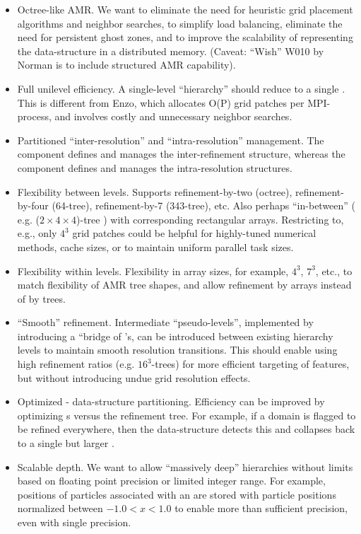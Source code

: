 \begin{itemize}
%
    \item Octree-like AMR. We want to eliminate the need for heuristic
      grid placement algorithms and neighbor searches, to simplify
      load balancing, eliminate the need for persistent ghost zones,
      and to improve the scalability of representing the
      data-structure in a distributed memory. (Caveat: ``Wish'' W010
      by Norman is to include structured AMR capability).
%
    \item Full unilevel efficiency. A single-level  ``hierarchy''
      should reduce to a single . This is different from Enzo,
      which allocates O(P) grid patches per MPI-process, and involves
      costly and unnecessary neighbor searches.
%
    \item Partitioned ``inter-resolution'' and ``intra-resolution''
      management. The  component defines and manages the
      inter-refinement structure, whereas the  component
      defines and manages the intra-resolution structures.
%
    \item Flexibility between levels. Supports refinement-by-two
      (octree), refinement-by-four (64-tree), refinement-by-7
      (343-tree), etc. Also perhaps ``in-between'' ( e.g. ($2 \times 4
      \times 4$)-tree ) with corresponding rectangular
      arrays. Restricting to, e.g., only $4^3$ grid patches could be
      helpful for highly-tuned numerical methods, cache sizes, or to
      maintain uniform parallel task sizes.
%
    \item Flexibility within levels. Flexibility in array sizes, for
      example, $4^3$, $7^3$, etc., to match flexibility of AMR tree
      shapes, and allow refinement by  arrays instead of
      by  trees.
%
    \item ``Smooth'' refinement. Intermediate ``pseudo-levels'',
      implemented by introducing a ``bridge of 's, can be
      introduced between existing hierarchy levels to maintain smooth
      resolution transitions. This should enable using high refinement
      ratios (e.g. $16^3$-trees) for more efficient targeting of
      features, but without introducing undue grid resolution effects.
%
    \item Optimized  -  data-structure
      partitioning. Efficiency can be improved by optimizing
      s versus the  refinement tree. For
      example, if a domain is flagged to be refined everywhere, then
      the  data-structure detects this and collapses back to
      a single but larger .
%
    \item Scalable depth. We want to allow ``massively deep''
       hierarchies without limits based on floating point
      precision or limited integer range.  For example, positions of
      particles associated with an   are stored
      with particle positions normalized between $-1.0 < x < 1.0$ to
      enable more than sufficient precision, even with single precision.
\end{itemize}

